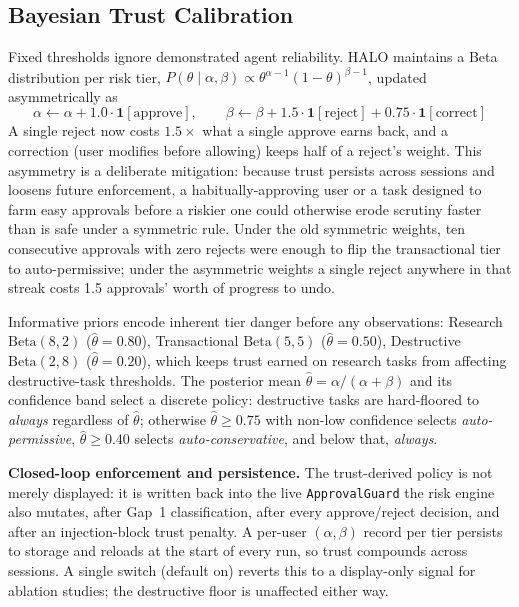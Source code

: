 \documentclass[a4paper, 11pt]{article}
\begin{document}
\subsection{Bayesian Trust Calibration}
\label{sec:trust}

Fixed thresholds ignore demonstrated agent reliability. HALO maintains a Beta
distribution per risk tier, $P(\theta \mid \alpha,\beta) \propto
\theta^{\alpha-1}(1-\theta)^{\beta-1}$, updated asymmetrically as
\begin{equation}
  \alpha \leftarrow \alpha + 1.0\cdot\mathbf{1}[\text{approve}], \qquad
  \beta  \leftarrow \beta  + 1.5\cdot\mathbf{1}[\text{reject}] + 0.75\cdot\mathbf{1}[\text{correct}]
  \label{eq:trust-update}
\end{equation}
A single reject now costs $1.5\times$ what a single approve earns back, and a
correction (user modifies before allowing) keeps half of a reject's weight. This
asymmetry is a deliberate mitigation: because trust persists across sessions and
loosens future enforcement, a habitually-approving user or a task designed to
farm easy approvals before a riskier one could otherwise erode scrutiny faster
than is safe under a symmetric rule. Under the old symmetric weights, ten
consecutive approvals with zero rejects were enough to flip the transactional
tier to auto-permissive; under the asymmetric weights a single reject anywhere in
that streak costs 1.5 approvals' worth of progress to undo.

Informative priors encode inherent tier danger before any observations: Research
$\text{Beta}(8,2)$ ($\hat{\theta}=0.80$), Transactional $\text{Beta}(5,5)$
($\hat{\theta}=0.50$), Destructive $\text{Beta}(2,8)$ ($\hat{\theta}=0.20$), which
keeps trust earned on research tasks from affecting destructive-task thresholds.
The posterior mean $\hat{\theta} = \alpha/(\alpha+\beta)$ and its confidence band
select a discrete policy: destructive tasks are hard-floored to \textit{always}
regardless of $\hat\theta$; otherwise $\hat\theta \geq 0.75$ with non-low
confidence selects \textit{auto-permissive}, $\hat\theta \geq 0.40$ selects
\textit{auto-conservative}, and below that, \textit{always}.

\textbf{Closed-loop enforcement and persistence.} The trust-derived policy is not
merely displayed: it is written back into the live \texttt{ApprovalGuard} the
risk engine also mutates, after Gap~1 classification, after every approve/reject
decision, and after an injection-block trust penalty. A per-user
$(\alpha,\beta)$ record per tier persists to storage and reloads at the start of
every run, so trust compounds across sessions. A single switch (default on)
reverts this to a display-only signal for ablation studies; the destructive floor
is unaffected either way.
\end{document}
